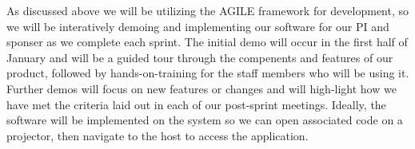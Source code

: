 \documentclass[10pt,twocolumn,letterpaper]{article}
\begin{document}
            As discussed above we will be utilizing the AGILE framework for development, so we will be interatively demoing and implementing our software for our PI and sponser as we complete each sprint. The initial demo will occur in the first half of January and will be a guided tour through the compenents and features of our product, followed by hands-on-training for the staff members who will be using it. Further demos will focus on new features or changes and will high-light how we have met the criteria laid out in each of our post-sprint meetings. Ideally, the software will be implemented on the system so we can open associated code on a projector, then navigate to the host to access the application.
\end{document}
